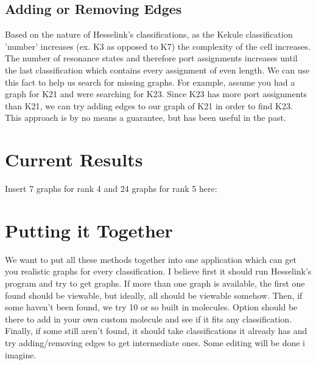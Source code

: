 \documentclass[12pt]{article}
\begin{document}
\subsection{Adding or Removing Edges}

Based on the nature of Hesselink's classifications, as the Kekule classification 'number' increases (ex. K3 as opposed to K7) the complexity of the cell increases. The number of resonance states and therefore port assignments increases until the last classification which contains every assignment of even length. We can use this fact to help us search for missing graphs. For example, assume you had a graph for K21 and were searching for K23. Since K23 has more port assignments than K21, we can try adding edges to our graph of K21 in order to find K23. This approach is by no means a guarantee, but has been useful in the past.

\section{Current Results}

Insert 7 graphs for rank 4 and 24 graphs for rank 5 here: 
%


%

\section{Putting it Together}

We want to put all these methods together into one application which can get you realistic graphs for every classification. I believe first it should run Hesselink's program and try to get graphs. If more than one graph is available, the first one found should be viewable, but ideally, all should be viewable somehow. Then, if some haven't been found, we try 10 or so built in molecules. Option should be there to add in your own custom molecule and see if it fits any classification. Finally, if some still aren't found, it should take classifications it already has and try adding/removing edges to get intermediate ones. Some editing will be done i imagine.
\end{document}
